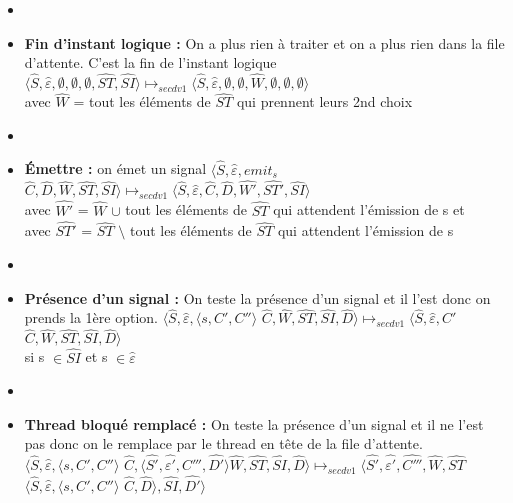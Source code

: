 \documentclass[10pt,a4paper]{article}
\begin{document}
\begin{itemize}
\begin{itemize}
							\item[]
							\item[] \textbf{Fin d'instant logique :} On a plus rien à traiter et on a plus rien dans la file d'attente. C'est la fin de l'instant logique
							\smallbreak  $\langle\widehat{S},\widehat{\varepsilon},\emptyset,\emptyset,\emptyset,\widehat{ST},\widehat{SI}\rangle 
							\longmapsto_{secdv1} \langle\widehat{S},\widehat{\varepsilon},\emptyset,\emptyset,\widehat{W},\emptyset,\emptyset,\emptyset\rangle$ 
							\\avec $\widehat{W}$ = tout les éléments de $\widehat{ST}$ qui prennent leurs 2nd choix 
							\item[]
							\item[] \textbf{\'{E}mettre :} on émet un signal 
							\smallbreak
							$\langle\widehat{S},\widehat{\varepsilon},emit_{s}$ $\widehat{C},\widehat{D},\widehat{W},\widehat{ST},\widehat{SI}\rangle 
							\longmapsto_{secdv1} 
							\langle \widehat{S},\widehat{\varepsilon},\widehat{C},\widehat{D},\widehat{W'},\widehat{ST'},\widehat{SI}\rangle$ 
							\\avec $\widehat{W'}$ = $\widehat{W}$ $\cup$ tout les éléments de $\widehat{ST}$ qui attendent l'émission de s et
							\\avec $\widehat{ST'}$ = $\widehat{ST}$ $\setminus$ tout les éléments de $\widehat{ST}$ qui attendent l'émission de s
							\item[]
							\item[] \textbf{Présence d'un signal :} On teste la présence d'un signal et il l'est donc on prends la 1ère option. 
							\smallbreak
							$\langle\widehat{S},\widehat{\varepsilon},\langle s, C',C''\rangle$ $\widehat{C},\widehat{W},\widehat{ST},\widehat{SI},\widehat{D}\rangle 
							\longmapsto_{secdv1} 
							\langle\widehat{S},\widehat{\varepsilon},C'$ $\widehat{C},\widehat{W},\widehat{ST},\widehat{SI},\widehat{D}\rangle$ 
							\\si s $\in \widehat{SI}$ et s $\in \widehat{\varepsilon}$ 
							\item[]
							\item[] \textbf{Thread bloqué remplacé :} On teste la présence d'un signal et il ne l'est pas donc on le remplace par le thread en tête de la file d'attente.
							\smallbreak 
							$\langle\widehat{S},\widehat{\varepsilon},\langle s, C',C''\rangle$ $\widehat{C},\langle\widehat{S'},\widehat{\varepsilon'},C''',\widehat{D'}\rangle\widehat{W},\widehat{ST},\widehat{SI},\widehat{D}\rangle 
							\longmapsto_{secdv1} \langle\widehat{S'},\widehat{\varepsilon'},\widehat{C'''},\widehat{W},\widehat{ST}$ $\langle\widehat{S},\widehat{\varepsilon},\langle s, C',C''\rangle$ $\widehat{C},\widehat{D}\rangle,\widehat{SI},\widehat{D'}\rangle$ 

\end{itemize}
\end{itemize}
\end{document}
